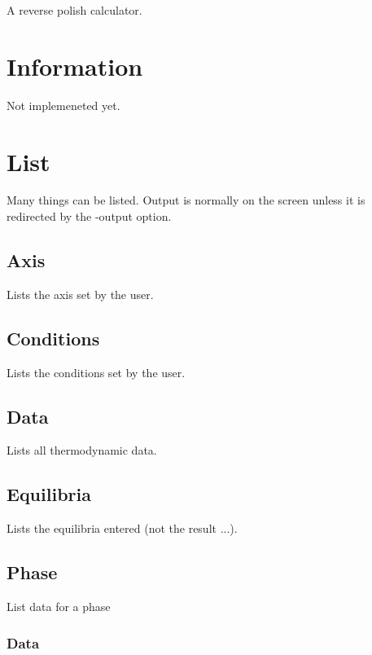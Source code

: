 \documentclass[12pt]{article}
\begin{document}
A reverse polish calculator.

\section{Information }

Not implemeneted yet.

\section{List }

Many things can be listed.  Output is normally on the screen unless it
is redirected by the -output option.

\subsection{Axis}

Lists the axis set by the user.

\subsection{Conditions}

Lists the conditions set by the user.

\subsection{Data}

Lists all thermodynamic data.

\subsection{Equilibria}

Lists the equilibria entered (not the result ...).

\subsection{Phase}

List data for a phase

\subsubsection{Data}
\end{document}
